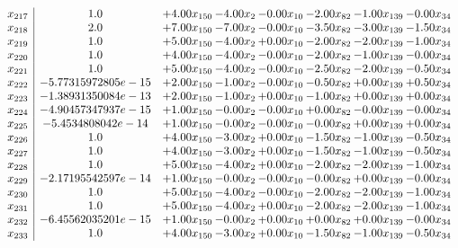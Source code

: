 \documentclass[8pt]{article}
\begin{document}
\[\begin{array}{c| c c@{\hskip 2pt} c@{\hskip 2pt} c@{\hskip 2pt} c@{\hskip 2pt} c@{\hskip 2pt} c@{\hskip 2pt} }
 x_{217}   &  1.0 & +  4.00 x_{150} & -4.00 x_{2} & -0.00 x_{10} & -2.00 x_{82} & -1.00 x_{139} & -0.00 x_{34}\\
 x_{218}   &  2.0 & +  7.00 x_{150} & -7.00 x_{2} & -0.00 x_{10} & -3.50 x_{82} & -3.00 x_{139} & -1.50 x_{34}\\
 x_{219}   &  1.0 & +  5.00 x_{150} & -4.00 x_{2} & +  0.00 x_{10} & -2.00 x_{82} & -2.00 x_{139} & -1.00 x_{34}\\
 x_{220}   &  1.0 & +  4.00 x_{150} & -4.00 x_{2} & -0.00 x_{10} & -2.00 x_{82} & -1.00 x_{139} & -0.00 x_{34}\\
 x_{221}   &  1.0 & +  5.00 x_{150} & -4.00 x_{2} & -0.00 x_{10} & -2.50 x_{82} & -2.00 x_{139} & -0.50 x_{34}\\
 x_{222}   &  -5.77315972805e-15 & +  2.00 x_{150} & -1.00 x_{2} & -0.00 x_{10} & -0.50 x_{82} & +  0.00 x_{139} & +  0.50 x_{34}\\
 x_{223}   &  -1.38931350084e-13 & +  2.00 x_{150} & -1.00 x_{2} & +  0.00 x_{10} & -1.00 x_{82} & +  0.00 x_{139} & +  0.00 x_{34}\\
 x_{224}   &  -4.90457347937e-15 & +  1.00 x_{150} & -0.00 x_{2} & -0.00 x_{10} & +  0.00 x_{82} & -0.00 x_{139} & -0.00 x_{34}\\
 x_{225}   &  -5.4534808042e-14 & +  1.00 x_{150} & -0.00 x_{2} & -0.00 x_{10} & -0.00 x_{82} & +  0.00 x_{139} & +  0.00 x_{34}\\
 x_{226}   &  1.0 & +  4.00 x_{150} & -3.00 x_{2} & +  0.00 x_{10} & -1.50 x_{82} & -1.00 x_{139} & -0.50 x_{34}\\
 x_{227}   &  1.0 & +  4.00 x_{150} & -3.00 x_{2} & +  0.00 x_{10} & -1.50 x_{82} & -1.00 x_{139} & -0.50 x_{34}\\
 x_{228}   &  1.0 & +  5.00 x_{150} & -4.00 x_{2} & +  0.00 x_{10} & -2.00 x_{82} & -2.00 x_{139} & -1.00 x_{34}\\
 x_{229}   &  -2.17195542597e-14 & +  1.00 x_{150} & -0.00 x_{2} & -0.00 x_{10} & -0.00 x_{82} & +  0.00 x_{139} & -0.00 x_{34}\\
 x_{230}   &  1.0 & +  5.00 x_{150} & -4.00 x_{2} & -0.00 x_{10} & -2.00 x_{82} & -2.00 x_{139} & -1.00 x_{34}\\
 x_{231}   &  1.0 & +  5.00 x_{150} & -4.00 x_{2} & +  0.00 x_{10} & -2.00 x_{82} & -2.00 x_{139} & -1.00 x_{34}\\
 x_{232}   &  -6.45562035201e-15 & +  1.00 x_{150} & -0.00 x_{2} & +  0.00 x_{10} & +  0.00 x_{82} & +  0.00 x_{139} & -0.00 x_{34}\\
 x_{233}   &  1.0 & +  4.00 x_{150} & -3.00 x_{2} & +  0.00 x_{10} & -1.50 x_{82} & -1.00 x_{139} & -0.50 x_{34}\\

\end{array}\]
\end{document}
